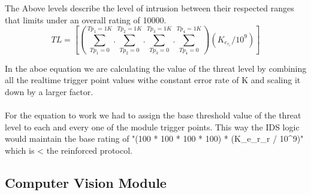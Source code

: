 \documentclass[letterpaper, 10 pt, conference]{ieeeconf}  %
\begin{document}
The Above levels describe the level of intrusion between their respected ranges that limits under an overall rating of 10000. \\

\begin{equation}
TL = [{(\sum_{Tp_1=0}^{Tp_1=1K} . \sum_{Tp_2=0}^{Tp_2=1K} . \sum_{Tp_3=0}^{Tp_3=1K} . \sum_{Tp_4=0}^{Tp_4=1K}) (K_e_r_r / 10^9)}]
\end{equation}

In the aboe equation we are calculating the value of the threat level by combining all the realtime trigger point values withe constant error rate of K and scaling it down by a larger factor.\\ \\
For the equation to work we had to assign the base threshold value of the threat level to each and every one of the module trigger points. This way the IDS logic would maintain the base rating of "{(100 * 100 * 100 * 100) * (K_e_r_r / 10^9)}"
which is < the reinforced protocol.




\subsection{Computer Vision Module}
\end{document}
